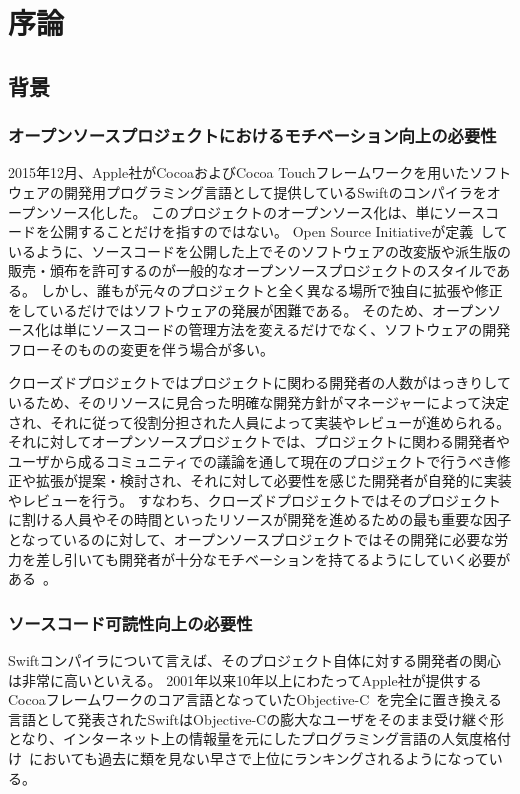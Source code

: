 \chapter{序論}
\label{introduction}

\section{背景}
\label{introduction:background}

\subsection{オープンソースプロジェクトにおけるモチベーション向上の必要性}

2015年12月、Apple社がCocoaおよびCocoa Touchフレームワークを用いたソフトウェアの開発用プログラミング言語として提供しているSwiftのコンパイラをオープンソース化した。
このプロジェクトのオープンソース化は、単にソースコードを公開することだけを指すのではない。
Open Source Initiativeが定義~\cite{opensource}しているように、ソースコードを公開した上でそのソフトウェアの改変版や派生版の販売・頒布を許可するのが一般的なオープンソースプロジェクトのスタイルである。
しかし、誰もが元々のプロジェクトと全く異なる場所で独自に拡張や修正をしているだけではソフトウェアの発展が困難である。
そのため、オープンソース化は単にソースコードの管理方法を変えるだけでなく、ソフトウェアの開発フローそのものの変更を伴う場合が多い。

クローズドプロジェクトではプロジェクトに関わる開発者の人数がはっきりしているため、そのリソースに見合った明確な開発方針がマネージャーによって決定され、それに従って役割分担された人員によって実装やレビューが進められる。
それに対してオープンソースプロジェクトでは、プロジェクトに関わる開発者やユーザから成るコミュニティでの議論を通して現在のプロジェクトで行うべき修正や拡張が提案・検討され、それに対して必要性を感じた開発者が自発的に実装やレビューを行う。
すなわち、クローズドプロジェクトではそのプロジェクトに割ける人員やその時間といったリソースが開発を進めるための最も重要な因子となっているのに対して、オープンソースプロジェクトではその開発に必要な労力を差し引いても開発者が十分なモチベーションを持てるようにしていく必要がある~\cite{raymond}。

\subsection{ソースコード可読性向上の必要性}

Swiftコンパイラについて言えば、そのプロジェクト自体に対する開発者の関心は非常に高いといえる。
2001年以来10年以上にわたってApple社が提供するCocoaフレームワークのコア言語となっていたObjective-C~\cite{objective-c}を完全に置き換える言語として発表されたSwiftはObjective-Cの膨大なユーザをそのまま受け継ぐ形となり、インターネット上の情報量を元にしたプログラミング言語の人気度格付け~\cite{tiobe, redmonk}においても過去に類を見ない早さで上位にランキングされるようになっている。

